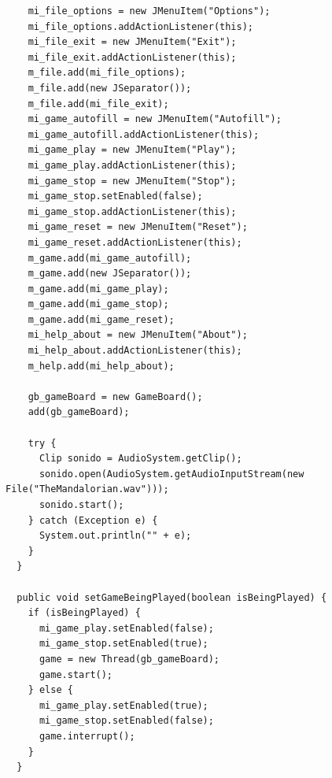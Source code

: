 \documentclass[12pt]{article}
\begin{document}
\begin{lstlisting}
    mi_file_options = new JMenuItem("Options");
    mi_file_options.addActionListener(this);
    mi_file_exit = new JMenuItem("Exit");
    mi_file_exit.addActionListener(this);
    m_file.add(mi_file_options);
    m_file.add(new JSeparator());
    m_file.add(mi_file_exit);
    mi_game_autofill = new JMenuItem("Autofill");
    mi_game_autofill.addActionListener(this);
    mi_game_play = new JMenuItem("Play");
    mi_game_play.addActionListener(this);
    mi_game_stop = new JMenuItem("Stop");
    mi_game_stop.setEnabled(false);
    mi_game_stop.addActionListener(this);
    mi_game_reset = new JMenuItem("Reset");
    mi_game_reset.addActionListener(this);
    m_game.add(mi_game_autofill);
    m_game.add(new JSeparator());
    m_game.add(mi_game_play);
    m_game.add(mi_game_stop);
    m_game.add(mi_game_reset);
    mi_help_about = new JMenuItem("About");
    mi_help_about.addActionListener(this);
    m_help.add(mi_help_about);

    gb_gameBoard = new GameBoard();
    add(gb_gameBoard);

    try {
      Clip sonido = AudioSystem.getClip();
      sonido.open(AudioSystem.getAudioInputStream(new File("TheMandalorian.wav")));
      sonido.start();
    } catch (Exception e) {
      System.out.println("" + e);
    }
  }

  public void setGameBeingPlayed(boolean isBeingPlayed) {
    if (isBeingPlayed) {
      mi_game_play.setEnabled(false);
      mi_game_stop.setEnabled(true);
      game = new Thread(gb_gameBoard);
      game.start();
    } else {
      mi_game_play.setEnabled(true);
      mi_game_stop.setEnabled(false);
      game.interrupt();
    }
  }


\end{lstlisting}
\end{document}
